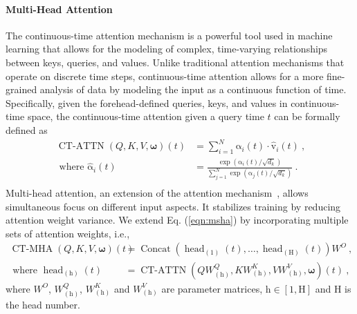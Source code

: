 \documentclass{article}
\begin{document}
\paragraph{Multi-Head Attention} 

The continuous-time attention mechanism is a powerful tool used in machine learning that allows for the modeling of complex, time-varying relationships between keys, queries, and values. Unlike traditional attention mechanisms that operate on discrete time steps, continuous-time attention allows for a more fine-grained analysis of data by modeling the input as a continuous function of time.
Specifically, given the forehead-defined queries, keys, and values in continuous-time space, the continuous-time attention given a query time $t$ can be formally defined as
\begin{equation}\
\begin{aligned}
    \operatorname{CT-ATTN}( Q, K, V, \boldsymbol{\omega})(t) & 
    = \sum_{i=1}^{N} \widehat{\boldsymbol{\mathrm{\alpha}}}_i(t) \cdot \widehat{\boldsymbol{\mathrm{v}}}_i(t) ~,\\
    \text { where } \widehat{\boldsymbol{\mathrm{\alpha}}}_i(t) & = \frac{\operatorname{exp} \left( \boldsymbol{\mathrm{\alpha}}_i(t) / \sqrt{d_k} \right)}{\sum_{j=1}^{N} \operatorname{exp} \left( \boldsymbol{\mathrm{\alpha}}_j(t) / \sqrt{d_k} \right)} ~. \\
\end{aligned}
\label{eqn:msha}
\end{equation}
Multi-head attention, an extension of the attention mechanism~\cite{vaswani2017attention}, allows simultaneous focus on different input aspects.
It stabilizes training by reducing attention weight variance.
We extend Eq. (\ref{eqn:msha}) by incorporating multiple sets of attention weights, i.e.,
\begin{equation}
\begin{aligned}
\operatorname{CT-MHA}(Q, K, V, \boldsymbol{\omega})(t) & =\operatorname{Concat}\left(\operatorname{head}_{(1)}(t), \ldots, \operatorname{head}_{(\mathrm{H})}(t)\right) W^O ~,\\
\text { where } \operatorname{head}_{(\mathrm{h})}(t) & =\operatorname{CT-ATTN}\left(Q W_{(\mathrm{h})}^Q, K W_{(\mathrm{h})}^K, V W_{(\mathrm{h})}^V, \boldsymbol{\omega} \right)(t) ~,
\end{aligned}
\label{eq:contiattn}
\end{equation}
where $W^O$, $W_{(\mathrm{h})}^Q$, $W_{(\mathrm{h})}^K$ and $W_{(\mathrm{h})}^V$ are parameter matrices, $\mathrm{h} \in [1,\mathrm{H}]$ and $\mathrm{H}$ is the head number.
\end{document}
